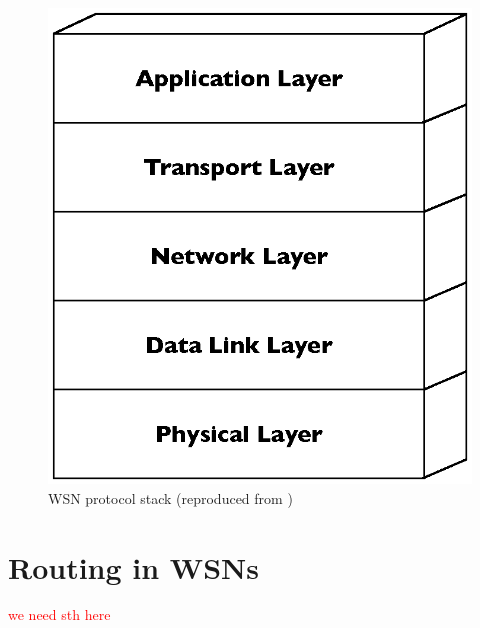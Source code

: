 \begin{figure}[h]
\centering
\includegraphics[scale=0.65]{img/ProtStack.eps}
\caption[WSN protocol stack]{WSN protocol stack (reproduced from \cite{SensorSurveyAkyildiz:2002})}
\label{Fig:ProtStack}
\end{figure}


\section {Routing in WSNs}
\textcolor{red}{we need sth here}